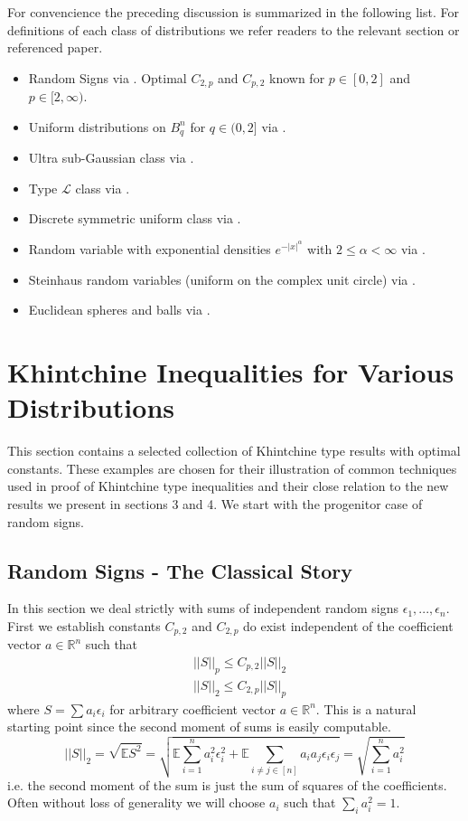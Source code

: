\documentclass[10pt]{article}
\newcommand{\E}{\mathbb{E}}
\newcommand{\1}{\textbf{1}}
\newcommand{\R}{\mathbb{R}}
\newcommand{\norm}[1]{\left\lvert\left\lvert#1\right\rvert\right\rvert}
\theoremstyle{remark}
\theoremstyle{definition}
\begin{document}
For convencience the preceding discussion is summarized in the following list. For definitions of each class of distributions we refer readers to the relevant section or referenced paper. 

\begin{itemize}
	\item Random Signs via \cite{H}. Optimal $C_{2,p}$ and $C_{p,2}$ known for $p \in [0,2]$ and $p \in [2,\infty)$. 
	\item Uniform distributions on $B_q^n$ for $q \in (0,2]$ via \cite{ENT}. 
	\item Ultra sub-Gaussian class via \cite{NO}.  
	\item Type $\mathcal{L}$ class via \cite{HNT}. 
	\item Discrete symmetric uniform class via \cite{HT}. 
	\item Random variable with exponential densities $e^{-|x|^{\alpha}}$ with $2 \leq \alpha < \infty$ via \cite{ENT2}.  
	\item Steinhaus random variables (uniform on the complex unit circle) via \cite{P}. 
	\item Euclidean spheres and balls via \cite{BC}. 
\end{itemize} 

\newpage

\section{Khintchine Inequalities for Various Distributions}

This section contains a selected collection of Khintchine type results with optimal constants. These examples are chosen for their illustration of common techniques used in proof of Khintchine type inequalities and their close relation to the new results we present in sections 3 and 4. We start with the progenitor case of random signs.

\subsection{Random Signs - The Classical Story}

In this section we deal strictly with sums of independent random signs $\epsilon_1,...,\epsilon_n$. First we establish constants $C_{p,2}$ and $C_{2,p}$ do exist independent of the coefficient vector $a \in \R^n$ such that 
\begin{align*}
	&\norm{S}_p \leq C_{p,2} \norm{S}_2 \\
	&\norm{S}_2 \leq C_{2,p}\norm{S}_p
\end{align*} where $S = \sum a_i \epsilon_i$ for arbitrary coefficient vector $a \in \R^n$. This is a natural starting point since the second moment of sums is easily computable.
\begin{equation*}
	\norm{S}_2 = \sqrt{\E S^2} = \sqrt{\E\sum_{i=1}^n a_i^2 \epsilon_i^2 + \E\sum_{i\neq j \in [n]}a_ia_j \epsilon_i\epsilon_j} = \sqrt{\sum_{i=1}^n a_i^2}
\end{equation*} i.e. the second moment of the sum is just the sum of squares of the coefficients. Often without loss of generality we will choose $a_i$ such that $\sum_i a_i^2 = 1$.  
\end{document}
